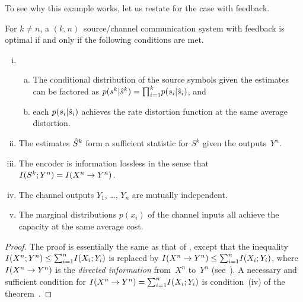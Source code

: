 To see why this example works, let us restate  for the case with
feedback. 
\begin{theorem}
  \label{thm:tcntcfb}
  For $k \ne n$, a $(k, n)$~source/channel communication system with feedback is
  optimal if and only if the following conditions are met.
  \begin{enumerate}[(i)]
    \item
      \begin{enumerate}[(a)]
        \item The conditional distribution of the source symbols given the
          estimates can be factored as $p(s^k|{\hat{s}}^k) = {\prod_{i=1}^k} p(s_i|{\hat{s}}_i)$, and
        \item each $p(s_i|{\hat{s}}_i)$ achieves the rate distortion function at the
          same average distortion.
      \end{enumerate}

    \item The estimates ${\hat{S}}^k$ form a sufficient statistic for $S^k$ given the
      outputs~$Y^n$.

    \item The encoder is information lossless in the sense that $I(S^k; Y^n) =
      I(X^n \rightarrow Y^n)$. 

    \item The channel outputs $Y_1$, \ldots, $Y_n$ are mutually independent.

    \item The marginal distributions $p(x_i)$ of the channel inputs all achieve
      the capacity at the same average cost.
  \end{enumerate}
\end{theorem}

\begin{proof}
  The proof is essentially the same as that of , except that the
  inequality $I(X^n;Y^n) \le {\sum_{i=1}^n} I(X_i; Y_i)$ is replaced by $I(X^n \rightarrow Y^n) \le
  {\sum_{i=1}^n} I(X_i; Y_i)$, where $I(X^n \rightarrow Y^n)$ is the \emph{directed information}
  from~$X^n$ to~$Y^n$ (see~\cite{Massey1990,Kramer1998}). A necessary and
  sufficient condition for $I(X^n \rightarrow Y^n) = {\sum_{i=1}^n} I(X_i; Y_i)$ is condition~(iv)
  of the theorem~\cite[Theorem~2]{Massey1990}.
\end{proof}

